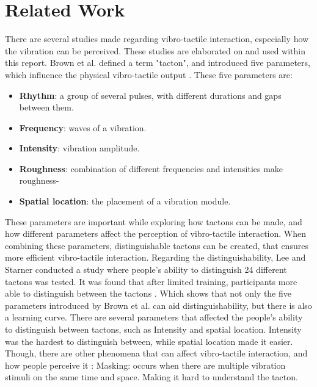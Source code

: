 \documentclass{sigchi}
\begin{document}
\section{Related Work}
There are several studies made regarding vibro-tactile interaction, especially how the vibration can be perceived. These studies are elaborated on and used within this report.  Brown et al. defined a term "tacton", and introduced five parameters, which influence the physical vibro-tactile output \cite{brown06}. These five parameters are:
\newline
\newline
\begin{itemize}
\item \textbf{Rhythm}: a group of several pulses, with different durations and gaps between them.
\item \textbf{Frequency}: waves of a vibration.
\item \textbf{Intensity}: vibration amplitude.
\item \textbf{Roughness}: combination of different frequencies and intensities make roughness-
\item \textbf{Spatial location}: the placement of a vibration module.
\end{itemize}
These parameters are important while exploring how tactons can be made, and how different parameters affect the perception of vibro-tactile interaction. When combining these parameters, distinguishable tactons can be created, that ensures more efficient vibro-tactile interaction. Regarding the distinguishability, Lee and Starner conducted a study where people's ability to distinguish 24 different tactons was tested. It was found that after limited training, participants more able to distinguish between the tactons \cite{lee10}. Which shows that not only the five parameters introduced by Brown et al. can aid distinguishability, but there is also a learning curve. 
\newline
\newline
There are several parameters that affected the people's ability to distinguish between tactons, such as Intensity and spatial location. Intensity was the hardest to distinguish between, while spatial location made it easier. Though, there are other phenomena that can affect vibro-tactile interaction, and how people perceive it \cite{myles07}: 
\newline
\newline 
Masking: occurs when there are multiple vibration stimuli on the same time and space. Making it hard to understand the tacton. 
\end{document}
